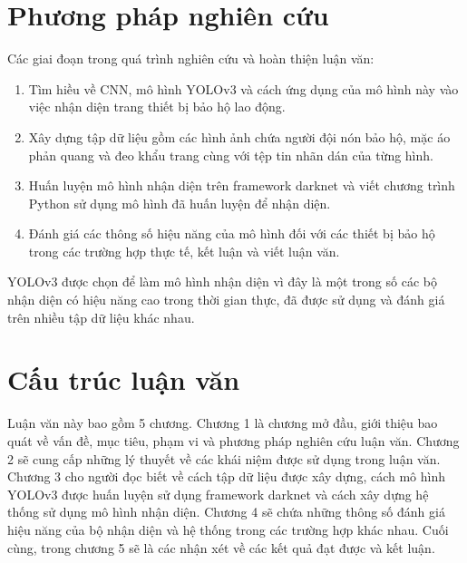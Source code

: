 \section{Phương pháp nghiên cứu}
Các giai đoạn trong quá trình nghiên cứu và hoàn thiện luận văn:
\begin{enumerate}
	\item Tìm hiều về CNN, mô hình YOLOv3 và cách ứng dụng của mô hình này vào việc nhận diện trang thiết bị bảo hộ lao động.
	\item Xây dựng tập dữ liệu gồm các hình ảnh chứa người đội nón bảo hộ, mặc áo phản quang và đeo khẩu trang cùng với tệp tin nhãn dán của từng hình.
	\item Huấn luyện mô hình nhận diện trên framework darknet và viết chương trình Python sử dụng mô hình đã huấn luyện để nhận diện.
	\item Đánh giá các thông số hiệu năng của mô hình đối với các thiết bị bảo hộ trong các trường hợp thực tế, kết luận và viết luận văn.
\end{enumerate}
YOLOv3 được chọn để làm mô hình nhận diện vì đây là một trong số các bộ nhận diện có hiệu năng cao trong thời gian thực, đã được sử dụng và đánh giá trên nhiều tập dữ liệu khác nhau.

\section{Cấu trúc luận văn}
Luận văn này bao gồm 5 chương. Chương 1 là chương mở đầu, giới thiệu bao quát về vấn đề, mục tiêu, phạm vi và phương pháp nghiên cứu luận văn. Chương 2 sẽ cung cấp những lý thuyết về các khái niệm được sử dụng trong luận văn. Chương 3 cho người đọc biết về cách tập dữ liệu được xây dựng, cách mô hình YOLOv3 được huấn luyện sử dụng framework darknet và cách xây dựng hệ thống sử dụng mô hình nhận diện. Chương 4 sẽ chứa những thông số đánh giá hiệu năng của bộ nhận diện và hệ thống trong các trường hợp khác nhau. Cuối cùng, trong chương 5 sẽ là các nhận xét về các kết quả đạt được và kết luận.